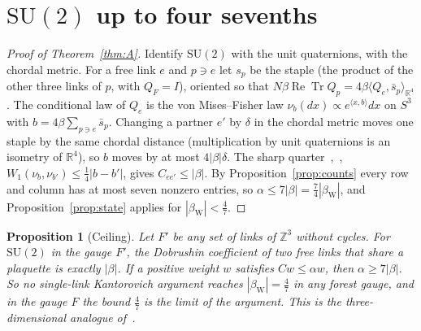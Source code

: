 \documentclass[11pt]{amsart}
\newtheorem{proposition}[theorem]{Proposition}
\theoremstyle{definition}
\theoremstyle{remark}
\newcommand{\Tr}{\operatorname{Tr}}
\renewcommand{\Re}{\operatorname{Re}}
\newcommand{\SU}{\mathrm{SU}}
\newcommand{\Z}{\mathbb{Z}}
\newcommand{\R}{\mathbb{R}}
\newcommand{\ip}[2]{\langle #1,#2\rangle}
\begin{document}
\section{\texorpdfstring{$\SU(2)$}{SU(2)} up to four sevenths}\label{sec:su2}

\begin{proof}[Proof of Theorem~\ref{thm:A}]
Identify $\SU(2)$ with the unit quaternions, with the chordal metric. For a free link $e$ and $p\ni e$ let $s_p$ be
the staple (the product of the other three links of $p$, with $Q_F=I$), oriented so that
$N\beta\Re\Tr Q_p=4\beta\ip{Q_e}{\bar s_p}_{\R^4}$. The conditional law of $Q_e$ is the von Mises--Fisher law
$\nu_b(dx)\propto e^{\ip xb}dx$ on $S^3$ with $b=4\beta\sum_{p\ni e}\bar s_p$. Changing a partner $e'$ by $\delta$ in
the chordal metric moves one staple by the same chordal distance (multiplication by unit quaternions is an isometry
of $\R^4$), so $b$ moves by at most $4|\beta|\delta$. The sharp quarter~\cite{BB-zen},~\cite[Thm.~91]{BBL},
$W_1(\nu_b,\nu_{b'})\le\frac14|b-b'|$, gives $C_{ee'}\le|\beta|$. By Proposition~\ref{prop:counts} every row and
column has at most seven nonzero entries, so $\alpha\le7|\beta|=\frac74|\beta_{\mathrm W}|$, and
Proposition~\ref{prop:state} applies for $|\beta_{\mathrm W}|<\frac47$.
\end{proof}

\begin{proposition}[Ceiling]\label{prop:ceiling}
Let $F'$ be any set of links of $\Z^3$ without cycles. For $\SU(2)$ in the gauge $F'$, the Dobrushin coefficient of
two free links that share a plaquette is exactly $|\beta|$. If a positive weight $w$ satisfies $Cw\le\alpha w$, then
$\alpha\ge7|\beta|$. So no single-link Kantorovich argument reaches $|\beta_{\mathrm W}|=\frac47$ in any forest gauge,
and in the gauge $F$ the bound $\frac47$ is the limit of the argument. This is the three-dimensional analogue
of~\cite[Thm.~2]{BBL}.
\end{proposition}
\end{document}
